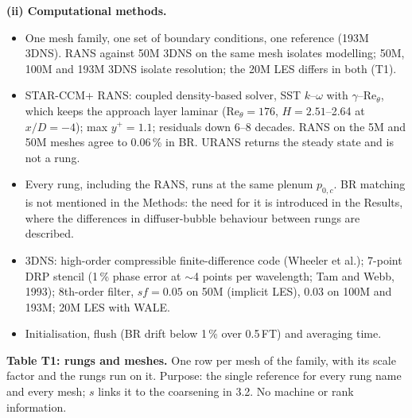 \documentclass[10pt]{article}
\begin{document}
\textbf{(ii) Computational methods.}
\begin{itemize}
\item One mesh family, one set of boundary conditions, one reference (193M 3DNS). RANS against 50M 3DNS on the
  same mesh isolates modelling; 50M, 100M and 193M 3DNS isolate resolution; the 20M LES differs in both (T1).
\item STAR-CCM+ RANS: coupled density-based solver, SST $k$--$\omega$ with $\gamma$--$\mathrm{Re}_\theta$, which
  keeps the approach layer laminar ($\mathrm{Re}_\theta=176$, $H=2.51$--2.64 at $x/D=-4$); max $y^+=1.1$;
  residuals down 6--8 decades. RANS on the 5M and 50M meshes agree to 0.06\,\% in BR. URANS returns the
  steady state and is not a rung.
\item Every rung, including the RANS, runs at the same plenum $p_{0,c}$. BR matching is not mentioned in the
  Methods: the need for it is introduced in the Results, where the differences in diffuser-bubble behaviour
  between rungs are described.
\item 3DNS: high-order compressible finite-difference code (Wheeler et al.); 7-point DRP stencil (1\,\% phase
  error at $\sim$4 points per wavelength; Tam and Webb, 1993); 8th-order filter, $sf=0.05$ on 50M (implicit
  LES), 0.03 on 100M and 193M; 20M LES with WALE.
\item Initialisation, flush (BR drift below 1\,\% over 0.5\,FT) and averaging time.
\end{itemize}

\textbf{Table T1: rungs and meshes.} One row per mesh of the family, with its scale factor and the
rungs run on it. Purpose: the single reference for every rung name and every mesh; $s$ links it to the
coarsening in 3.2. No machine or rank information.
\end{document}
